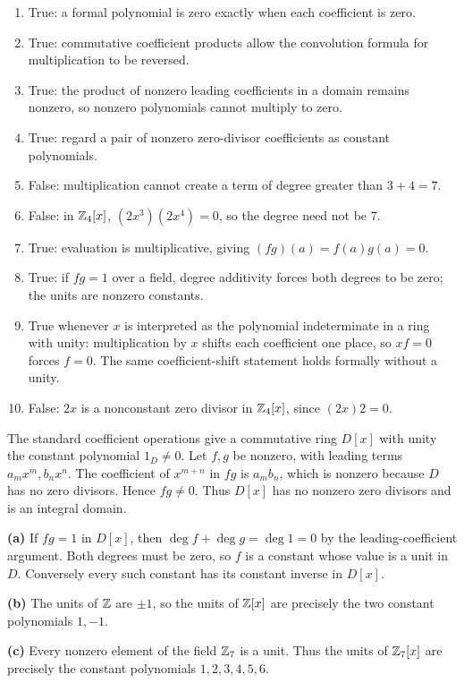 \begin{enumerate}[label=(\alph*)]
\item True: a formal polynomial is zero exactly when each coefficient is zero.
\item True: commutative coefficient products allow the convolution formula for multiplication to be reversed.
\item True: the product of nonzero leading coefficients in a domain remains nonzero, so nonzero polynomials cannot multiply to zero.
\item True: regard a pair of nonzero zero-divisor coefficients as constant polynomials.
\item False: multiplication cannot create a term of degree greater than $3+4=7$.
\item False: in $\mathbb{Z}_4[x]$, $(2x^3)(2x^4)=0$, so the degree need not be $7$.
\item True: evaluation is multiplicative, giving $(fg)(a)=f(a)g(a)=0$.
\item True: if $fg=1$ over a field, degree additivity forces both degrees to be zero; the units are nonzero constants.
\item True whenever $x$ is interpreted as the polynomial indeterminate in a ring with unity: multiplication by $x$ shifts each coefficient one place, so $xf=0$ forces $f=0$. The same coefficient-shift statement holds formally without a unity.
\item False: $2x$ is a nonconstant zero divisor in $\mathbb{Z}_4[x]$, since $(2x)2=0$.
\end{enumerate}

The standard coefficient operations give a commutative ring $D[x]$ with unity the constant polynomial $1_D\ne0$. Let $f,g$ be nonzero, with leading terms $a_mx^m,b_nx^n$. The coefficient of $x^{m+n}$ in $fg$ is $a_mb_n$, which is nonzero because $D$ has no zero divisors. Hence $fg\ne0$. Thus $D[x]$ has no nonzero zero divisors and is an integral domain.

\textbf{(a)} If $fg=1$ in $D[x]$, then $\deg f+\deg g=\deg1=0$ by the leading-coefficient argument. Both degrees must be zero, so $f$ is a constant whose value is a unit in $D$. Conversely every such constant has its constant inverse in $D[x]$.\par
\textbf{(b)} The units of $\mathbb{Z}$ are $\pm1$, so the units of $\mathbb{Z}[x]$ are precisely the two constant polynomials $1,-1$.\par
\textbf{(c)} Every nonzero element of the field $\mathbb{Z}_7$ is a unit. Thus the units of $\mathbb{Z}_7[x]$ are precisely the constant polynomials $1,2,3,4,5,6$.

